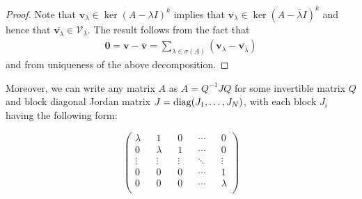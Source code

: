 \begin{proof}
  Note that $\boldsymbol{v}_{\lambda}\in \ker(A-\lambda I)^{k}$
  implies that
  $\overline{\boldsymbol{v}_{\lambda}} \in \ker(A-\overline{\lambda}
  I)^{k}$
  and hence that
  $\overline{ \boldsymbol{v}_{ \overline{\lambda}}} \in
  \mathcal{V}_{\lambda}$.  The result follows from the fact that
\begin{align*}
\boldsymbol{0}=\boldsymbol{v}-\overline{\boldsymbol{v}}=\sum\limits_{\lambda\in \sigma(A)}(\boldsymbol{v}_{\lambda}-\overline{ \boldsymbol{v}_{ \overline{\lambda}}})
\end{align*}
and from uniqueness of the above decomposition.
%
%
\end{proof}

Moreover, we can write any matrix $A$ as $A=Q^{-1}JQ$ for some
invertible matrix $Q$ and block diagonal Jordan matrix
$J=\operatorname{diag}(J_{1},\ldots,J_{N})$, with each block $J_{i}$ having the
following form:

\begin{equation*}
\begin{pmatrix}
\lambda	&&	1		&&	0		&&	\cdots	&&	0		\\
0		&&	\lambda	&&	1		&&	\cdots	&&	0		\\
\vdots	&&	\vdots	&&	\vdots	&&	\ddots	&&	\vdots	\\
0		&&	0		&&	0		&&	\cdots	&&	1		\\
0		&&	0		&&	0		&&	\cdots	&&	\lambda	\\
\end{pmatrix}
\end{equation*}

